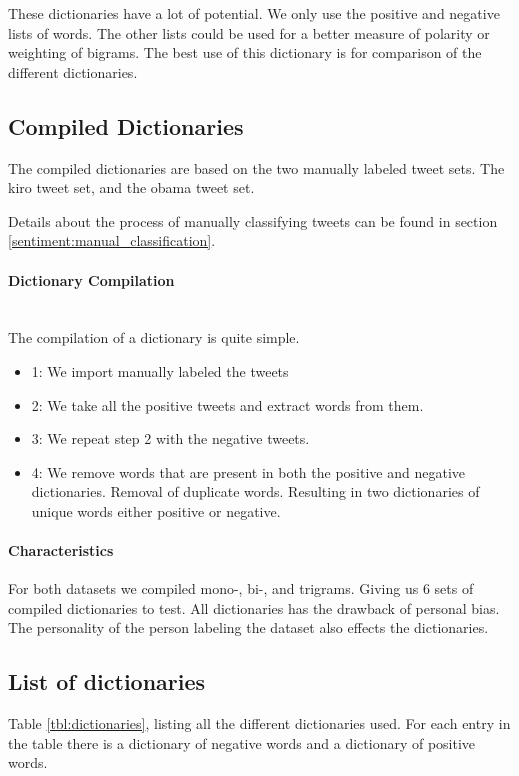 These dictionaries have a lot of potential. We only use the
positive and negative lists of words. The other lists could be used for a
better measure of polarity or weighting of bigrams. The best use of this
dictionary is for comparison of the different dictionaries.  
%

\subsection{Compiled Dictionaries}\label{data:compiled_dictionaries}
The compiled dictionaries are based on the two manually labeled tweet sets. The
kiro tweet set, and the obama tweet set.

Details about the process of manually classifying tweets can be found in section
\ref{sentiment:manual_classification}.

\paragraph{Dictionary Compilation}
\hspace{0pt}\\
The compilation of a dictionary is quite simple. 
\begin{itemize}
    \item 1: We import manually labeled the tweets
    \item 2: We take all the positive tweets and extract words from them. 
    \item 3: We repeat step 2 with the negative tweets. 
    \item 4: We remove words that are present in both the positive and negative
dictionaries. Removal of duplicate words. Resulting in two dictionaries of
unique words either positive or negative.  
\end{itemize}

\paragraph{Characteristics}
For both datasets we compiled mono-, bi-, and trigrams. Giving us 6 sets of
compiled dictionaries to test. All dictionaries has the drawback of personal
bias. The personality of the person labeling the dataset also effects the
dictionaries. 
%

\subsection{List of dictionaries}
Table \ref{tbl:dictionaries}, listing all the different dictionaries used. 
For each entry in the table there is a dictionary of negative words and a
dictionary of positive words. 

